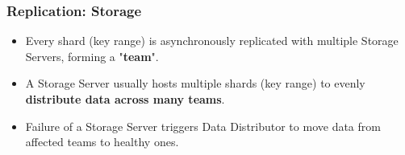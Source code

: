 

\begin{frame}
	\frametitle{Replication: Storage}
\begin{itemize}

      \item Every shard (key range) is asynchronously replicated with multiple Storage Servers, forming a "\textbf{team}".
      \item A Storage Server usually hosts multiple shards (key range) to evenly \textbf{distribute data across many teams}.
      \item Failure of a Storage Server triggers Data Distributor to move data from affected teams to healthy ones.

\end{itemize}
\end{frame}